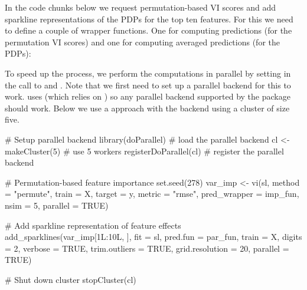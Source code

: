 
In the code chunks below we request permutation-based VI scores and add sparkline representations of the PDPs for the top ten features. For this we need to define a couple of wrapper functions. One for computing predictions (for the permutation VI scores) and one for computing averaged predictions (for the PDPs):


To speed up the process, we perform the computations in parallel by setting  in the call to  and . Note that we first need to set up a parallel backend for this to work.  uses  \citep{plyr-pkg} (which relies on  \citep{foreach-pkg}) so any parallel backend supported by the  package should work. Below we use a  approach with the  backend \citep{doParallel-pkg} using a cluster of size five.

\begin{example}
# Setup parallel backend
library(doParallel) # load the parallel backend
cl <- makeCluster(5) # use 5 workers
registerDoParallel(cl) # register the parallel backend

# Permutation-based feature importance
set.seed(278)
var_imp <- vi(sl, method = "permute", train = X, target = y, metric = "rmse",
              pred_wrapper = imp_fun, nsim = 5, parallel = TRUE)

# Add sparkline representation of feature effects
add_sparklines(var_imp[1L:10L, ], fit = sl, pred.fun = par_fun, train = X, 
               digits = 2, verbose = TRUE, trim.outliers = TRUE, 
               grid.resolution = 20, parallel = TRUE)
               
# Shut down cluster
stopCluster(cl)
\end{example}


